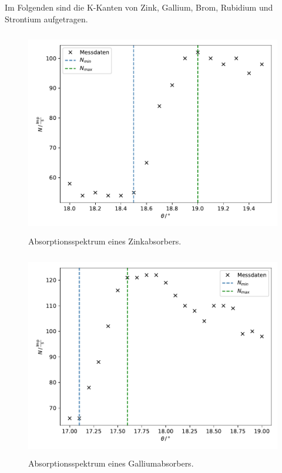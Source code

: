 \noindent
Im Folgenden sind die K-Kanten von Zink, Gallium, Brom, Rubidium und Strontium aufgetragen.

\begin{figure}
    \centering
       \includegraphics[height=9cm]{daten/zink.pdf}
       \caption{Absorptionsspektrum eines Zinkabsorbers.}
       \label{fig:zink}
\end{figure}

\begin{figure}
    \centering
       \includegraphics[height=9cm]{daten/gallium.pdf}
       \caption{Absorptionsspektrum eines Galliumabsorbers.}
       \label{fig:gallium}
\end{figure}

